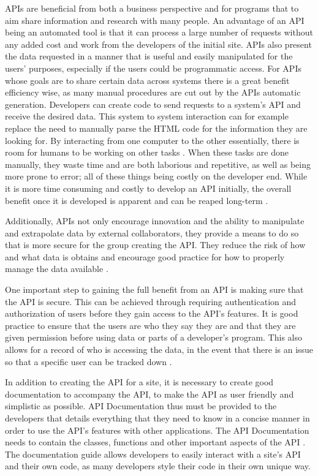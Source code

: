 		APIs are beneficial from both a business perspective and for programs 
		that to aim share information and research with many people. An 
		advantage of an API being an automated tool is that it can process a 
		large number of requests without any added cost and work from the 
		developers of the initial site. APIs also present the data requested in 
		a manner that is useful and easily manipulated for the users' purposes, 
		especially if the users could be programmatic access. For APIs whose 
		goals are to share certain data across systems there is a great benefit 
		efficiency wise, as many manual procedures are cut out by the APIs 
		automatic generation. Developers can create code to send requests to a 
		system's API and receive the desired data. This system to system interaction 
		can for example replace the need to manually parse the HTML code for the 
		information they are looking for. By interacting from one computer to the 
		other essentially, there is room for humans to be working on other tasks 
		\cite{amazon}. When these tasks are done manually, they waste 
		time and are both laborious and repetitive, as well as being more prone 
		to error; all of these things being costly on the developer end. While 
		it is more time consuming and costly to develop an API initially, the 
		overall benefit once it is developed is apparent and can be reaped 
		long-term \cite{govapi}.

		Additionally, APIs not only encourage innovation and the ability to 
		manipulate and extrapolate data by external collaborators, they provide 
		a means to do so that is more secure for the group creating the API. 
		They reduce the risk of how and what data is obtains and encourage good 
		practice for how to properly manage the data available \cite{readwrite}.

		One important step to gaining the full benefit from an API is making 
		sure that the API is secure. This can be achieved through requiring 
		authentication and authorization of users before they gain access to the
		API's features. It is good practice to ensure that the users are who 
		they say they are and that they are given permission before using data 
		or parts of a developer's program. This also allows for a record of who 
		is accessing the data, in the event that there is an issue so that a 
		specific user can be tracked down \cite{jisc}.

		In addition to creating the API for a site, it is necessary to create 
		good documentation to accompany the API, to make the API as user 
		friendly and simplistic as possible. API Documentation thus must be 
		provided to the developers that details everything that they need to 
		know in a concise manner in order to use the API’s features with other 
		applications. The API Documentation needs to contain the classes, 
		functions and other important aspects of the API \cite{cio}. The 
		documentation guide allows developers to easily interact with a site's 
		API and their own code, as many developers style their code in their own 
		unique way. 
		
